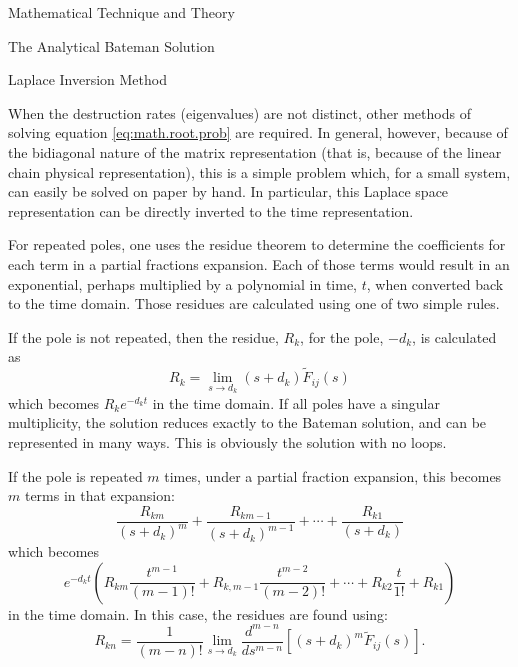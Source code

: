 \begin{chapter}{Mathematical Technique and Theory\label{chap:math}}
\begin{section}{The Analytical Bateman Solution}
  \end{section}

  \begin{section}{Laplace Inversion Method}\label{sec:math.inversion}
  
    When the destruction rates (eigenvalues) are not distinct, other
    methods of solving equation \ref{eq:math.root.prob} are required.
    In general, however, because of the bidiagonal nature of the
    matrix representation (that is, because of the linear chain
    physical representation), this is a simple problem which, for a
    small system, can easily be solved on paper by hand.  In
    particular, this Laplace space representation can be directly
    inverted to the time representation.
  
    For repeated poles, one uses the residue theorem to determine the
    coefficients for each term in a partial fractions expansion.  Each
    of those terms would result in an exponential, perhaps multiplied
    by a polynomial in time, $t$, when converted back to the time
    domain.  Those residues are calculated using one of two simple
    rules.
  
    If the pole is not repeated, then the residue, $R_k$, for the pole,
    $-d_k$, is calculated as
    \begin{equation}
      R_k = \lim_{s\rightarrow d_k} (s+d_k) \tilde{F}_{ij}(s)
    \end{equation}
    which becomes $R_k e^{-d_kt}$ in the time domain.  If all poles have a
    singular multiplicity, the solution reduces exactly to the Bateman
    solution, and can be represented in many ways.  This is obviously the
    solution with no loops.
    
    If the pole is repeated $m$ times, under a partial fraction
    expansion, this becomes $m$ terms in that expansion:
    \begin{equation}
      \frac{R_{km}}{(s+d_k)^m} + \frac{R_{km-1}}{(s+d_k)^{m-1}} +\cdots + \frac{R_{k1}}{(s+d_k)}
    \end{equation}
    which becomes 
    \begin{equation}
      e^{-d_kt} \left ( R_{km} \frac{t^{m-1}}{(m-1)!} + R_{k,m-1}
        \frac{t^{m-2}}{(m-2)!} + \cdots + R_{k2} \frac{t}{1!} + R_{k1} \right )
    \end{equation}
    in the time domain.  In this case, the residues are found using:
    \begin{equation}
      R_{kn} = \frac{1}{(m-n)!} \lim_{s\rightarrow d_k}
      \frac{d^{m-n}}{ds^{m-n}} \left [ (s+d_k)^m \tilde{F}_{ij}(s) \right].
    \end{equation}
    

\end{section}
\end{chapter}

